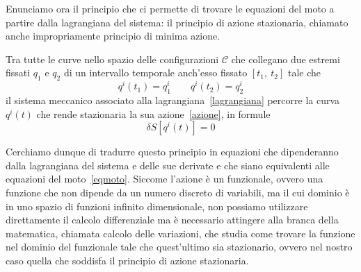     Enunciamo ora il principio che ci permette di trovare le equazioni del moto a partire dalla lagrangiana del sistema: il principio di azione stazionaria, chiamato anche impropriamente principio di minima azione.

    \begin{principle}
        Tra tutte le curve nello spazio delle configurazioni $\mathcal C$ che collegano due estremi fissati $q_1$ e $q_2$ di un intervallo temporale anch'esso fissato $[t_1, ~t_2]$ tale che 
    \begin{equation*}
        q^i(t_1) = q^i_1 \qquad q^i(t_2) = q^i_2
    \end{equation*}
        il sistema meccanico associato alla lagrangiana~\eqref{lagrangiana} percorre la curva $q^i(t)$ che rende stazionaria la sua azione~\eqref{azione}, in formule
    \begin{equation} \label{azionestazionaria}
        \delta S [q^i(t)] = 0
    \end{equation}
    \end{principle}

    Cerchiamo dunque di tradurre questo principio in equazioni che dipenderanno dalla lagrangiana del sistema e delle sue derivate e che siano equivalenti alle equazioni del moto~\eqref{eqmoto}. Siccome l'azione è un funzionale, ovvero una funzione che non dipende da un numero discreto di variabili, ma il cui dominio è in uno spazio di funzioni infinito dimensionale, non possiamo utilizzare direttamente il calcolo differenziale ma è necessario attingere alla branca della matematica, chiamata calcolo delle variazioni, che studia come trovare la funzione nel dominio del funzionale tale che quest'ultimo sia stazionario, ovvero nel nostro caso quella che soddisfa il principio di azione stazionaria. 
    
